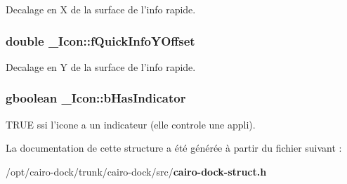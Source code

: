 Decalage en X de la surface de l'info rapide. 

\subsubsection{\setlength{\rightskip}{0pt plus 5cm}double {\bf \_\-Icon::fQuickInfoYOffset}}\label{struct__Icon_301e7fc7080150fcabbb0931319a9d0a}


Decalage en Y de la surface de l'info rapide. 

\subsubsection{\setlength{\rightskip}{0pt plus 5cm}gboolean {\bf \_\-Icon::bHasIndicator}}\label{struct__Icon_babf418c6dd218fc6e90dd36b8ef2355}


TRUE ssi l'icone a un indicateur (elle controle une appli). 



La documentation de cette structure a été générée à partir du fichier suivant :\begin{CompactItemize}
\item 
/opt/cairo-dock/trunk/cairo-dock/src/{\bf cairo-dock-struct.h}\end{CompactItemize}
